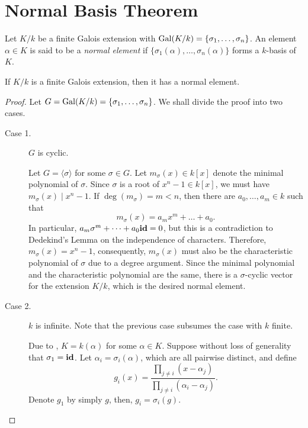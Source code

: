 \section{Normal Basis Theorem}

\begin{definition}
    Let $K/k$ be a finite Galois extension with $\operatorname{Gal}(K/k) = \{\sigma_1,\dots,\sigma_n\}$. An element $\alpha\in K$ is said to be a \emph{normal element} if $\{\sigma_1(\alpha),\dots,\sigma_n(\alpha)\}$ forms a $k$-basis of $K$.
\end{definition}

\begin{theorem}
    If $K/k$ is a finite Galois extension, then it has a normal element.
\end{theorem}
\begin{proof}
    Let $G = \operatorname{Gal}(K/k) = \{\sigma_1,\dots,\sigma_n\}$. We shall divide the proof into two cases.
\begin{description}
    \item[Case 1.] $G$ is cyclic.

    Let $G = \langle\sigma\rangle$ for some $\sigma\in G$. Let $m_\sigma(x)\in k[x]$ denote the minimal polynomial of $\sigma$. Since $\sigma$ is a root of $x^n - 1\in k[x]$, we must have $m_\sigma(x)\mid x^n - 1$. If $\deg(m_\sigma) = m < n$, then there are $a_0,\dots,a_m\in k$ such that 
    \begin{equation*}
        m_\sigma(x) = a_mx^m + \dots + a_0.
    \end{equation*}
    In particular, $a_m\sigma^m + \dots + a_0\mathbf{id} = 0$, but this is a contradiction to Dedekind's Lemma on the independence of characters. Therefore, $m_\sigma(x) = x^n - 1$, consequently, $m_\sigma(x)$ must also be the characteristic polynomial of $\sigma$ due to a degree argument. Since the minimal polynomial and the characteristic polynomial are the same, there is a $\sigma$-cyclic vector for the extension $K/k$, which is the desired normal element.

    \item[Case 2.] $k$ is infinite. Note that the previous case subsumes the case with $k$ finite.

    Due to , $K = k(\alpha)$ for some $\alpha\in K$. Suppose without loss of generality that $\sigma_1 = \mathbf{id}$. Let $\alpha_i = \sigma_i(\alpha)$, which are all pairwise distinct, and define
    \begin{equation*}
        g_i(x) = \frac{\prod_{j\ne i}(x - \alpha_j)}{\prod_{j\ne i}(\alpha_i - \alpha_j)}.
    \end{equation*}
    Denote $g_1$ by simply $g$, then, $g_i = \sigma_i(g)$.


\end{description}
\end{proof}
